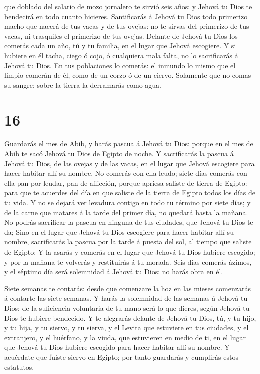 que doblado del salario de mozo jornalero te sirvió seis años: y Jehová
tu Dios te bendecirá en todo cuanto hicieres.  Santificarás
á Jehová tu Dios todo primerizo macho que nacerá de tus vacas y de tus
ovejas: no te sirvas del primerizo de tus vacas, ni trasquiles el
primerizo de tus ovejas.  Delante de Jehová tu Dios los
comerás cada un año, tú y tu familia, en el lugar que Jehová escogiere.
 Y si hubiere en él tacha, ciego ó cojo, ó cualquiera mala
falta, no lo sacrificarás á Jehová tu Dios.  En tus
poblaciones lo comerás: el inmundo lo mismo que el limpio comerán de él,
como de un corzo ó de un ciervo.  Solamente que no comas su
sangre: sobre la tierra la derramarás como agua.

\hypertarget{section-15}{%
\section{16}\label{section-15}}

 Guardarás el mes de Abib, y harás pascua á Jehová tu Dios:
porque en el mes de Abib te sacó Jehová tu Dios de Egipto de noche.
 Y sacrificarás la pascua á Jehová tu Dios, de las ovejas y
de las vacas, en el lugar que Jehová escogiere para hacer habitar allí
su nombre.  No comerás con ella leudo; siete días comerás
con ella pan por leudar, pan de aflicción, porque apriesa saliste de
tierra de Egipto: para que te acuerdes del día en que saliste de la
tierra de Egipto todos los días de tu vida.  Y no se dejará
ver levadura contigo en todo tu término por siete días; y de la carne
que matares á la tarde del primer día, no quedará hasta la mañana.
 No podrás sacrificar la pascua en ninguna de tus ciudades,
que Jehová tu Dios te da;  Sino en el lugar que Jehová tu
Dios escogiere para hacer habitar allí su nombre, sacrificarás la pascua
por la tarde á puesta del sol, al tiempo que saliste de Egipto:
 Y la asarás y comerás en el lugar que Jehová tu Dios
hubiere escogido; y por la mañana te volverás y restituirás á tu morada.
 Seis días comerás ázimos, y el séptimo día será solemnidad
á Jehová tu Dios: no harás obra en él.

 Siete semanas te contarás: desde que comenzare la hoz en
las mieses comenzarás á contarte las siete semanas.  Y
harás la solemnidad de las semanas á Jehová tu Dios: de la suficiencia
voluntaria de tu mano será lo que dieres, según Jehová tu Dios te
hubiere bendecido.  Y te alegrarás delante de Jehová tu
Dios, tú, y tu hijo, y tu hija, y tu siervo, y tu sierva, y el Levita
que estuviere en tus ciudades, y el extranjero, y el huérfano, y la
viuda, que estuvieren en medio de ti, en el lugar que Jehová tu Dios
hubiere escogido para hacer habitar allí su nombre.  Y
acuérdate que fuiste siervo en Egipto; por tanto guardarás y cumplirás
estos estatutos.

